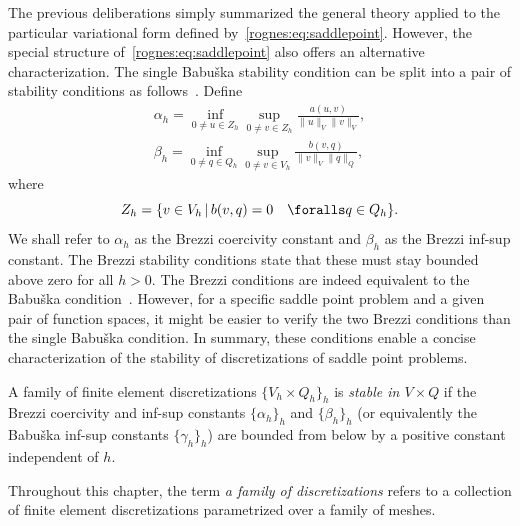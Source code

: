 The previous deliberations simply summarized the general theory
applied to the particular variational form defined
by~\eqref{rognes:eq:saddlepoint}. However, the special structure
of~\eqref{rognes:eq:saddlepoint} also offers an alternative
characterization. The single Babu\v ska stability condition can be split
into a pair of stability conditions as
follows~\citep{Brezzi1974}. Define
\begin{align}
  \label{rognes:eq:brezzi:coercivity}
  \alpha_h =
  \inf_{0 \not = u \in Z_h}
  \sup_{0 \not = v \in Z_h}
  \frac{a(u, v)}{\|u\|_{V} \|v\|_{V}} , \\
  \label{rognes:eq:brezzi:infsup}
  \beta_h =
  \inf_{0 \not = q \in Q_h}
  \sup_{0 \not = v \in V_h}
  \frac{b(v, q)}
       {\|v\|_{V} \|q\|_{Q}},
\end{align}
where
\begin{equation}
  Z_h = \{ v \in V_h \, | \, b(v, q) = 0 \quad \foralls q \in Q_h\}.
\end{equation}
We shall refer to $\alpha_h$ as the Brezzi coercivity constant and
$\beta_h$ as the Brezzi inf-sup constant. The Brezzi stability
conditions state that these must stay bounded above zero for all $h >
0$. The Brezzi conditions are indeed equivalent to the Babu\v ska
condition~\citep{Brezzi1974}. However, for a specific saddle point
problem and a given pair of function spaces, it might be easier to
verify the two Brezzi conditions than the single Babu\v ska condition.
In summary, these conditions enable a concise characterization of the
stability of discretizations of saddle point problems.
\begin{definition}
  \label{rognes:def:stable}
  A family of finite element discretizations $\{V_h \times Q_h\}_h$ is
  \emph{stable in $V \times Q$} if the Brezzi coercivity and inf-sup
  constants $\{ \alpha_h \}_h $ and $\{ \beta_h \}_h$ (or equivalently
  the Babu\v{s}ka inf-sup constants $\{ \gamma_h \}_h$) are bounded
  from below by a positive constant independent of $h$.
\end{definition}
Throughout this chapter, the term \emph{a family of discretizations}
refers to a collection of finite element discretizations parametrized
over a family of meshes.

